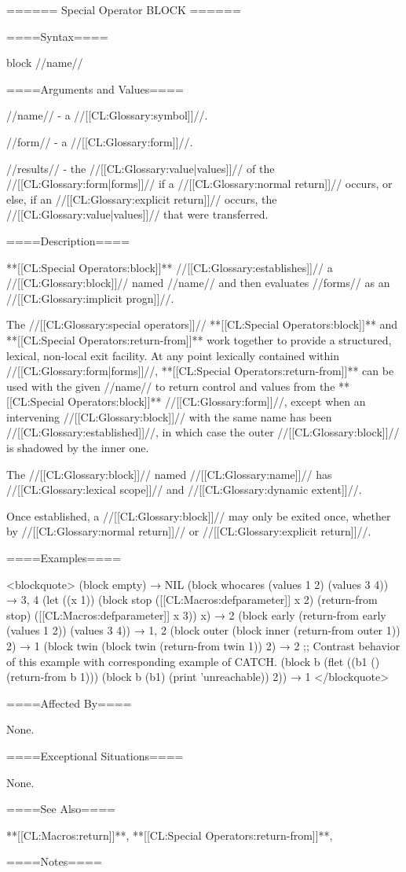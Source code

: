 ====== Special Operator BLOCK ======

====Syntax====

\DefspecWithValues block {//name// } {}

====Arguments and Values====

//name// - a //[[CL:Glossary:symbol]]//.

//form// - a //[[CL:Glossary:form]]//.

//results// - the //[[CL:Glossary:value|values]]// of the //[[CL:Glossary:form|forms]]// if a //[[CL:Glossary:normal return]]// occurs, or else, if an //[[CL:Glossary:explicit return]]// occurs, the //[[CL:Glossary:value|values]]// that were transferred.

====Description====

**[[CL:Special Operators:block]]** //[[CL:Glossary:establishes]]// a //[[CL:Glossary:block]]// named //name// and then evaluates //forms// as an //[[CL:Glossary:implicit progn]]//.

The //[[CL:Glossary:special operators]]// **[[CL:Special Operators:block]]** and **[[CL:Special Operators:return-from]]** work together to provide a structured, lexical, non-local exit facility. At any point lexically contained within //[[CL:Glossary:form|forms]]//, **[[CL:Special Operators:return-from]]** can be used with the given //name// to return control and values from the **[[CL:Special Operators:block]]** //[[CL:Glossary:form]]//, except when an intervening //[[CL:Glossary:block]]// with the same name has been //[[CL:Glossary:established]]//, in which case the outer //[[CL:Glossary:block]]// is shadowed by the inner one.

The //[[CL:Glossary:block]]// named //[[CL:Glossary:name]]// has //[[CL:Glossary:lexical scope]]// and //[[CL:Glossary:dynamic extent]]//.

Once established, a //[[CL:Glossary:block]]// may only be exited once, whether by //[[CL:Glossary:normal return]]// or //[[CL:Glossary:explicit return]]//.

====Examples====

<blockquote> (block empty) → NIL (block whocares (values 1 2) (values 3 4)) → 3, 4 (let ((x 1)) (block stop ([[CL:Macros:defparameter]] x 2) (return-from stop) ([[CL:Macros:defparameter]] x 3)) x) → 2 (block early (return-from early (values 1 2)) (values 3 4)) → 1, 2 (block outer (block inner (return-from outer 1)) 2) → 1 (block twin (block twin (return-from twin 1)) 2) → 2 ;; Contrast behavior of this example with corresponding example of CATCH. (block b (flet ((b1 () (return-from b 1))) (block b (b1) (print 'unreachable)) 2)) → 1 </blockquote>

====Affected By====

None.

====Exceptional Situations====

None.

====See Also====

**[[CL:Macros:return]]**, **[[CL:Special Operators:return-from]]**, {\secref\Evaluation}

====Notes====

